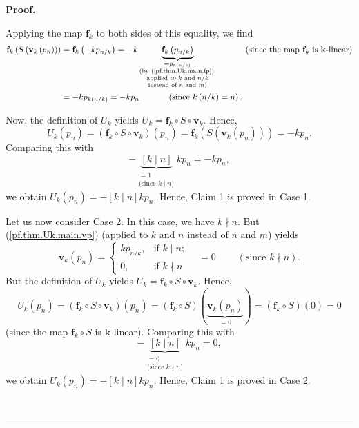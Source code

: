 \documentclass[numbers=enddot,12pt,final,onecolumn,notitlepage]{scrartcl}%
\theoremstyle{definition}
\newenvironment{proof}[1][Proof]{\noindent\textbf{#1.} }{\ \rule{0.5em}{0.5em}}
\newenvironment{verlong}{}{}
\newenvironment{vershort}{}{}
\begin{document}
\begin{proof}
\begin{vershort}
\end{vershort}

\begin{verlong}
\noindent Applying the map $\mathbf{f}_{k}$ to both sides of this equality, we
find
\begin{align*}
\mathbf{f}_{k}\left(  S\left(  \mathbf{v}_{k}\left(  p_{n}\right)  \right)
\right)   &  =\mathbf{f}_{k}\left(  -kp_{n/k}\right)
=-k\underbrace{\mathbf{f}_{k}\left(  p_{n/k}\right)  }_{\substack{=p_{k\left(
n/k\right)  }\\\text{(by (\ref{pf.thm.Uk.main.fp}),}\\\text{applied to
}k\text{ and }n/k\\\text{instead of }n\text{ and }m\text{)}}%
}\ \ \ \ \ \ \ \ \ \ \left(  \text{since the map }\mathbf{f}_{k}\text{ is
}\mathbf{k}\text{-linear}\right) \\
&  =-kp_{k\left(  n/k\right)  }=-kp_{n}\ \ \ \ \ \ \ \ \ \ \left(  \text{since
}k\left(  n/k\right)  =n\right)  .
\end{align*}

\end{verlong}

\noindent Now, the definition of $U_{k}$ yields $U_{k}=\mathbf{f}_{k}\circ
S\circ\mathbf{v}_{k}$. Hence,%
\[
U_{k}\left(  p_{n}\right)  =\left(  \mathbf{f}_{k}\circ S\circ\mathbf{v}%
_{k}\right)  \left(  p_{n}\right)  =\mathbf{f}_{k}\left(  S\left(
\mathbf{v}_{k}\left(  p_{n}\right)  \right)  \right)  =-kp_{n}.
\]
Comparing this with%
\[
-\underbrace{\left[  k\mid n\right]  }_{\substack{=1\\\text{(since }k\mid
n\text{)}}}kp_{n}=-kp_{n},
\]
we obtain $U_{k}\left(  p_{n}\right)  =-\left[  k\mid n\right]  kp_{n}$.
Hence, Claim 1 is proved in Case 1.

Let us now consider Case 2. In this case, we have $k\nmid n$. But
(\ref{pf.thm.Uk.main.vp}) (applied to $k$ and $n$ instead of $n$ and $m$)
yields%
\[
\mathbf{v}_{k}\left(  p_{n}\right)  =%
\begin{cases}
kp_{n/k}, & \text{if }k\mid n;\\
0, & \text{if }k\nmid n
\end{cases}
\ \ \ \ =0\ \ \ \ \ \ \ \ \ \ \left(  \text{since }k\nmid n\right)  .
\]
But the definition of $U_{k}$ yields $U_{k}=\mathbf{f}_{k}\circ S\circ
\mathbf{v}_{k}$. Hence,%
\[
U_{k}\left(  p_{n}\right)  =\left(  \mathbf{f}_{k}\circ S\circ\mathbf{v}%
_{k}\right)  \left(  p_{n}\right)  =\left(  \mathbf{f}_{k}\circ S\right)
\left(  \underbrace{\mathbf{v}_{k}\left(  p_{n}\right)  }_{=0}\right)
=\left(  \mathbf{f}_{k}\circ S\right)  \left(  0\right)  =0
\]
(since the map $\mathbf{f}_{k}\circ S$ is $\mathbf{k}$-linear). Comparing this
with%
\[
-\underbrace{\left[  k\mid n\right]  }_{\substack{=0\\\text{(since }k\nmid
n\text{)}}}kp_{n}=0,
\]
we obtain $U_{k}\left(  p_{n}\right)  =-\left[  k\mid n\right]  kp_{n}$.
Hence, Claim 1 is proved in Case 2.


\end{proof}
\end{document}
